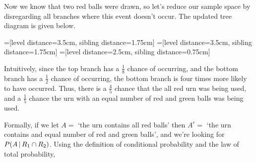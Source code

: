 \begin{examp}
\begin{center}
\end{center}
\par
\noindent Now we know that two red balls were drawn, so let's reduce our sample space by disregarding all branches where this event doesn't occur. The updated tree diagram is given below.
\begin{center}
=[level distance=3.5cm, sibling distance=1.75cm]
=[level distance=3.5cm, sibling distance=1.75cm]
=[level distance=2.5cm, sibling distance=0.75cm]
\end{center}
Intuitively, since the top branch has a $\frac{1}{8}$ chance of occurring, and the bottom branch has a $\frac{1}{2}$ chance of occurring, the bottom branch is four times more likely to have occurred. Thus, there is a $\frac{4}{5}$ chance that the all red urn was being used, and a $\frac{1}{5}$ chance the urn with an equal number of red and green balls was being used.
\par
\noindent Formally, if we let $A =$ `the urn contains all red balls' then $A^c =$ `the urn contains and equal number of red and green balls', and we're looking for $P(A \,|\, R_1 \cap R_2)$. Using the definition of conditional probability and the law of total probability,
\end{examp}
